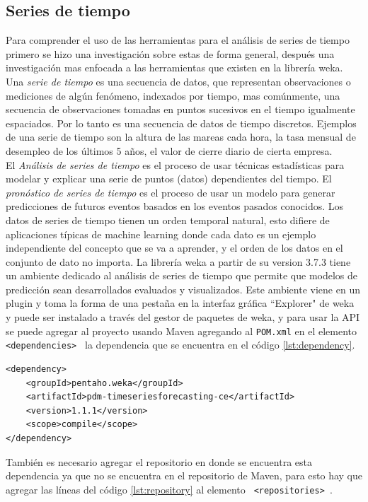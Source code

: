 \subsection{Series de tiempo} \label{subsec:estudiost}
Para comprender el uso de las herramientas para el análisis de series de tiempo primero se hizo una investigación sobre estas de forma general, después una investigación mas enfocada a las herramientas que existen en la librería weka.\\
Una \textit{serie de tiempo} es una secuencia de datos, que representan observaciones o
mediciones de algún fenómeno, indexados por tiempo, mas comúnmente, una
secuencia de observaciones tomadas en puntos sucesivos en el tiempo igualmente
espaciados. Por lo tanto es una secuencia de datos de tiempo discretos. Ejemplos
de una serie de tiempo son la altura de las mareas cada hora, la tasa mensual de
desempleo de los últimos 5 años, el valor de cierre diario de cierta empresa.\\
El \textit{Análisis de series de tiempo} es el proceso de usar técnicas estadísticas para modelar y explicar una serie de puntos (datos) dependientes del tiempo. El \textit{pronóstico de series de tiempo} es el proceso
de  usar un modelo para generar predicciones de futuros eventos basados en los eventos pasados conocidos.
Los datos de series de tiempo tienen un orden temporal natural, esto difiere de aplicaciones típicas de 
machine learning donde cada dato es un ejemplo independiente del concepto que se va a aprender, y el orden
de los datos en el conjunto de dato no importa. 
La librería weka a partir de su version 3.7.3 tiene un ambiente dedicado al análisis de series de tiempo que
permite que modelos de predicción sean desarrollados evaluados y visualizados. Este ambiente viene en un plugin y toma la forma de una pestaña en la interfaz gráfica ``Explorer" de weka y puede ser instalado a través del gestor de paquetes de weka, y para usar la API se puede agregar al proyecto usando Maven agregando al \texttt{POM.xml} en el elemento {\tt \lstinline$ <dependencies>$ } la dependencia que se encuentra en el código \ref{lst:dependency}.
\begin{lstlisting}[frame=single]  
<dependency>
	<groupId>pentaho.weka</groupId>
	<artifactId>pdm-timeseriesforecasting-ce</artifactId>
	<version>1.1.1</version>
	<scope>compile</scope>
</dependency>
\end{lstlisting} 
También es necesario agregar el repositorio en donde se encuentra esta dependencia ya que no se encuentra en el repositorio de Maven, para esto hay que agregar las líneas del código \ref{lst:repository} al elemento  {\tt \lstinline$ <repositories>$ }. 

